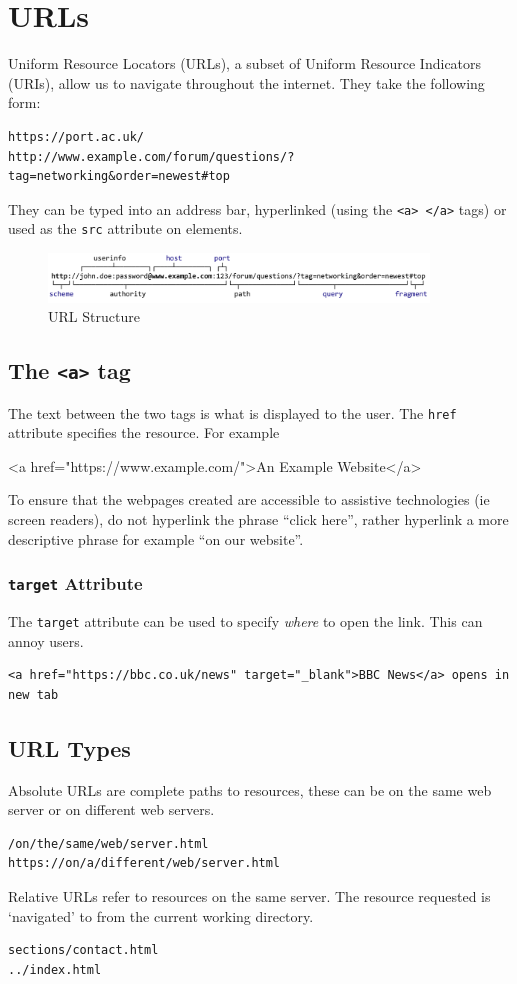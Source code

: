 
\section*{URLs}
Uniform Resource Locators (URLs), a subset of Uniform Resource Indicators (URIs), allow us to navigate throughout the internet. They take the following form:
\begin{verbatim}
https://port.ac.uk/
http://www.example.com/forum/questions/?tag=networking&order=newest#top
\end{verbatim}
They can be typed into an address bar, hyperlinked (using the \verb|<a> </a>| tags) or used as the \verb|src| attribute on elements.
\begin{figure}[H]
    \centering
    \includegraphics[width=0.9\textwidth]{assets/url-structure.png}
    \caption{URL Structure}
\end{figure}

\subsection*{The \texttt{<a>} tag}
The text between the two tags is what is displayed to the user. The \verb|href| attribute specifies the resource. For example
\begin{html}
<a href="https://www.example.com/">An Example Website</a>
\end{html}
To ensure that the webpages created are accessible to assistive technologies (ie screen readers), do not hyperlink the phrase ``click here'', rather hyperlink a more descriptive phrase for example ``on our website''. 
\subsubsection*{\texttt{target} Attribute}
The \verb|target| attribute can be used to specify \textit{where} to open the link. This can annoy users.
\begin{verbatim}
<a href="https://bbc.co.uk/news" target="_blank">BBC News</a> opens in new tab
\end{verbatim}

\subsection*{URL Types}
Absolute URLs are complete paths to resources, these can be on the same web server or on different web servers.
\begin{verbatim}
/on/the/same/web/server.html
https://on/a/different/web/server.html
\end{verbatim}
Relative URLs refer to resources on the same server. The resource requested is `navigated' to from the current working directory.
\begin{verbatim}
sections/contact.html
../index.html
\end{verbatim}

